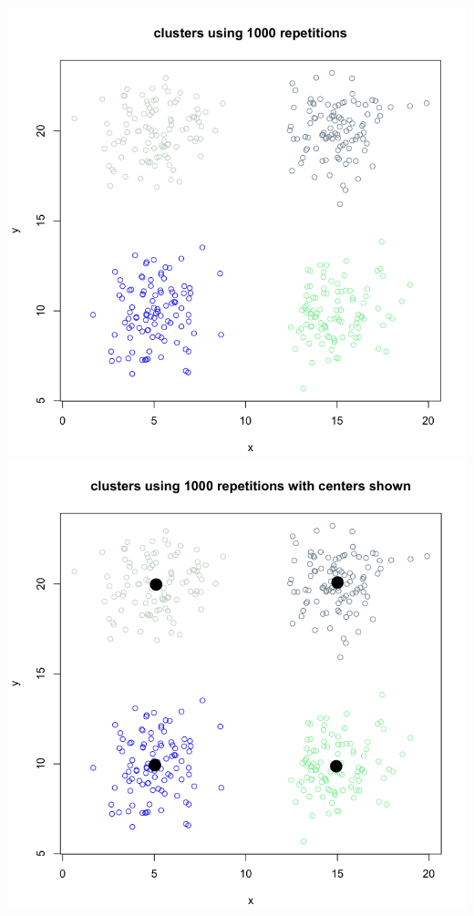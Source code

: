 \documentclass[11pt]{article}
\begin{document}
\begin{enumerate}
\begin{enumerate}
\begin{center}
\includegraphics[scale=0.35]{pix/clustered}
\includegraphics[scale=0.35]{pix/clustered_wcenters}
\end{center}


\end{enumerate}
\end{enumerate}
\end{document}
